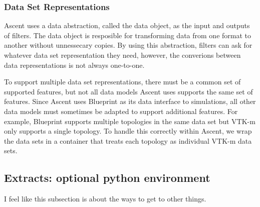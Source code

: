 \subsubsection{Data Set Representations}
Ascent uses a data abstraction, called the data object, as the input
and outputs of filters.
%
The data object is resposible for transforming data from one format
to another without unnessecary copies.
%
By using this abstraction, filters can ask for whatever data set
representation they need, however, the converions between data
representations is not always one-to-one.
%

To support multiple data set representations, there must be a common
set of supported features, but not all data models Ascent uses
supports the same set of features.
%
Since Ascent uses Blueprint as its data interface to simulations,
all other data models must sometimes be adapted to support additional
features.
%
For example, Blueprint supports multiple topologies in the same data set
but VTK-m only supports a single topology.
%
To handle this correctly within Ascent, we wrap the data sets in a container
that treats each topology as individual VTK-m data sets.
%

\subsection{Extracts: optional python environment}
I feel like this subsection is about the ways to get to other things.
